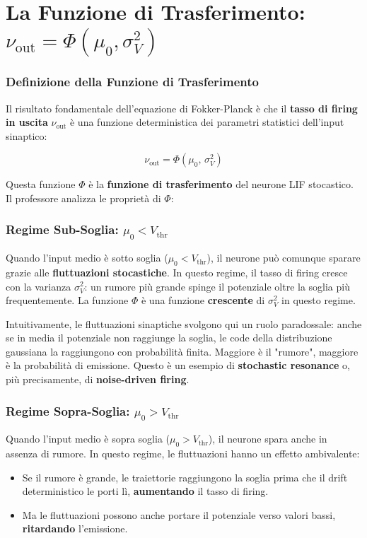 \section{La Funzione di Trasferimento: $\nu_{\text{out}} = \Phi(\mu_0, \sigma_V^2)$}

\subsubsection{Definizione della Funzione di Trasferimento}

Il risultato fondamentale dell'equazione di Fokker-Planck è che il \textbf{tasso di firing in uscita} $\nu_{\text{out}}$ è una funzione deterministica dei parametri statistici dell'input sinaptico:

\begin{equation}
\nu_{\text{out}} = \Phi(\mu_0,\, \sigma_V^2)
\end{equation}

Questa funzione $\Phi$ è la \textbf{funzione di trasferimento} del neurone LIF stocastico. Il professore analizza le proprietà di $\Phi$:

\subsubsection{Regime Sub-Soglia: $\mu_0 < V_{\text{thr}}$}

Quando l'input medio è sotto soglia ($\mu_0 < V_{\text{thr}}$), il neurone può comunque sparare grazie alle \textbf{fluttuazioni stocastiche}. In questo regime, il tasso di firing cresce con la varianza $\sigma_V^2$: un rumore più grande spinge il potenziale oltre la soglia più frequentemente. La funzione $\Phi$ è una funzione \textbf{crescente} di $\sigma_V^2$ in questo regime.

Intuitivamente, le fluttuazioni sinaptiche svolgono qui un ruolo paradossale: anche se in media il potenziale non raggiunge la soglia, le code della distribuzione gaussiana la raggiungono con probabilità finita. Maggiore è il "rumore", maggiore è la probabilità di emissione. Questo è un esempio di \textbf{stochastic resonance} o, più precisamente, di \textbf{noise-driven firing}.

\subsubsection{Regime Sopra-Soglia: $\mu_0 > V_{\text{thr}}$}

Quando l'input medio è sopra soglia ($\mu_0 > V_{\text{thr}}$), il neurone spara anche in assenza di rumore. In questo regime, le fluttuazioni hanno un effetto ambivalente:
\begin{itemize}
    \item Se il rumore è grande, le traiettorie raggiungono la soglia prima che il drift deterministico le porti lì, \textbf{aumentando} il tasso di firing.
    \item Ma le fluttuazioni possono anche portare il potenziale verso valori bassi, \textbf{ritardando} l'emissione.
\end{itemize}

